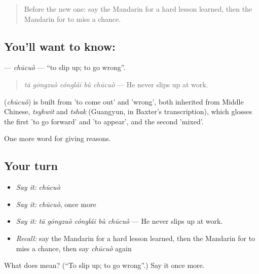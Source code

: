 \label{lesson:ZH-C356-chucuo}



\begin{quote}
Before the new one: say the Mandarin for a hard lesson learned, then the Mandarin for to miss a chance.
\end{quote}

\subsection*{You'll want to know: }
\textbf{} — \emph{chūcuò} — \textquotedblleft{}to slip up; to go wrong\textquotedblright{}.

\begin{quote}
\textbf{} \emph{tā gōngzuò cónglái bù chūcuò} — He never slips up at work.
\end{quote}

\begin{cousinweb}
\textbf{} (\emph{chūcuò}) is built from  'to come out' and  'wrong', both inherited from Middle Chinese, \emph{tsyhwit} and \emph{tshak} (Guangyun, in Baxter's transcription), which glosses the first 'to go forward' and 'to appear', and the second 'mixed'.
\end{cousinweb}

\begin{grammarlens}[title={What you've built}]
One more word for giving reasons.
\end{grammarlens}

\subsection*{Your turn}
\begin{itemize}
\raggedright
  \item \emph{Say it:} \emph{chūcuò}
  \item \emph{Say it:} \emph{chūcuò}, once more
  \item \emph{Say it:} \emph{tā gōngzuò cónglái bù chūcuò} — He never slips up at work.
  \item \emph{Recall:} say the Mandarin for a hard lesson learned, then the Mandarin for to miss a chance, then say \emph{chūcuò} again
\end{itemize}

\begin{tcolorbox}[breakable,colback=teal!4,colframe=teal!35!black,title={Before you move on}]
What does  mean? (\textquotedblleft{}To slip up; to go wrong\textquotedblright{}.) Say it once more.
\end{tcolorbox}
